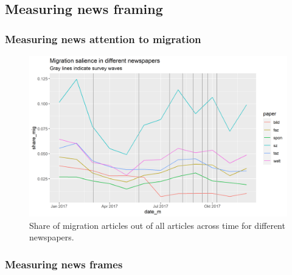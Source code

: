 \documentclass{article}
\begin{document}
\subsection{Measuring news framing}

\subsubsection{Measuring news attention to migration}



\begin{figure}[!ht]
    \centering
    \includegraphics[width=\textwidth]{paper/vis/salience_papers_focus.png}
    \caption{Share of migration articles out of all articles across time for different newspapers.}
    \label{fig:salience}
\end{figure}


\subsubsection{Measuring news frames}
\end{document}
